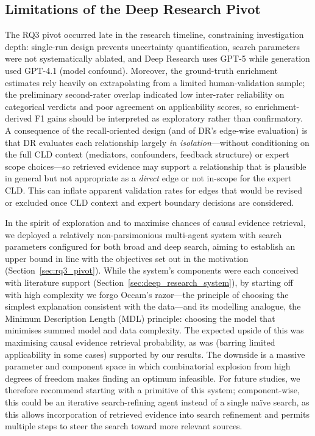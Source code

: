 \subsection{Limitations of the Deep Research Pivot}

The RQ3 pivot occurred late in the research timeline, constraining investigation depth: single-run design prevents uncertainty quantification, search parameters were not systematically ablated, and Deep Research uses GPT-5 while generation used GPT-4.1 (model confound). Moreover, the ground-truth enrichment estimates rely heavily on extrapolating from a limited human-validation sample; the preliminary second-rater overlap indicated low inter-rater reliability on categorical verdicts and poor agreement on applicability scores, so enrichment-derived F1 gains should be interpreted as exploratory rather than confirmatory. A consequence of the recall-oriented design (and of DR's edge-wise evaluation) is that DR evaluates each relationship largely \textit{in isolation}---without conditioning on the full CLD context (mediators, confounders, feedback structure) or expert scope choices---so retrieved evidence may support a relationship that is plausible in general but not appropriate as a \emph{direct} edge or not in-scope for the expert CLD. This can inflate apparent validation rates for edges that would be revised or excluded once CLD context and expert boundary decisions are considered.

In the spirit of exploration and to maximise chances of causal evidence retrieval, we deployed a relatively non-parsimonious multi-agent system with search parameters configured for both broad and deep search, aiming to establish an upper bound in line with the objectives set out in the motivation (Section~\ref{sec:rq3_pivot}). While the system's components were each conceived with literature support (Section~\ref{sec:deep_research_system}), by starting off with high complexity we forgo Occam's razor---the principle of choosing the simplest explanation consistent with the data---and its modelling analogue, the Minimum Description Length (MDL) principle: choosing the model that minimises summed model and data complexity. The expected upside of this was maximising causal evidence retrieval probability, as was (barring limited applicability in some cases) supported by our results. The downside is a massive parameter and component space in which combinatorial explosion from high degrees of freedom makes finding an optimum infeasible. For future studies, we therefore recommend starting with a primitive of this system; component-wise, this could be an iterative search-refining agent instead of a single naïve search, as this allows incorporation of retrieved evidence into search refinement and permits multiple steps to steer the search toward more relevant sources.

